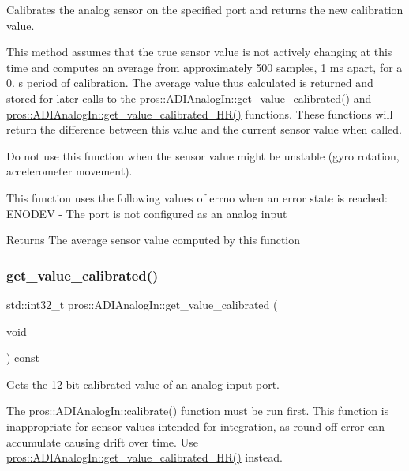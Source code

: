 Calibrates the analog sensor on the specified port and returns the new calibration value.

This method assumes that the true sensor value is not actively changing at this time and computes an average from approximately 500 samples, 1 ms apart, for a 0. s period of calibration. The average value thus calculated is returned and stored for later calls to the \hyperlink{classpros_1_1ADIAnalogIn_a5930ce87c880833bda8cd202613b8d80}{pros\+::\+A\+D\+I\+Analog\+In\+::get\+\_\+value\+\_\+calibrated()} and \hyperlink{classpros_1_1ADIAnalogIn_a65bfed175ed1b0efce4566e78e7f9473}{pros\+::\+A\+D\+I\+Analog\+In\+::get\+\_\+value\+\_\+calibrated\+\_\+\+H\+R()} functions. These functions will return the difference between this value and the current sensor value when called.

Do not use this function when the sensor value might be unstable (gyro rotation, accelerometer movement).

This function uses the following values of errno when an error state is reached\+: E\+N\+O\+D\+EV -\/ The port is not configured as an analog input

\begin{DoxyReturn}{Returns}
The average sensor value computed by this function 
\end{DoxyReturn}
\mbox{\label{classpros_1_1ADIAnalogIn_a5930ce87c880833bda8cd202613b8d80}} 
\subsubsection{\texorpdfstring{get\+\_\+value\+\_\+calibrated()}{get\_value\_calibrated()}}
{\footnotesize\ttfamily std\+::int32\+\_\+t pros\+::\+A\+D\+I\+Analog\+In\+::get\+\_\+value\+\_\+calibrated (\begin{DoxyParamCaption}\item[{void}]{ }\end{DoxyParamCaption}) const}

Gets the 12 bit calibrated value of an analog input port.

The \hyperlink{classpros_1_1ADIAnalogIn_ac8dd1e625cbcec4951d20be0c0fa2d3c}{pros\+::\+A\+D\+I\+Analog\+In\+::calibrate()} function must be run first. This function is inappropriate for sensor values intended for integration, as round-\/off error can accumulate causing drift over time. Use \hyperlink{classpros_1_1ADIAnalogIn_a65bfed175ed1b0efce4566e78e7f9473}{pros\+::\+A\+D\+I\+Analog\+In\+::get\+\_\+value\+\_\+calibrated\+\_\+\+H\+R()} instead.


